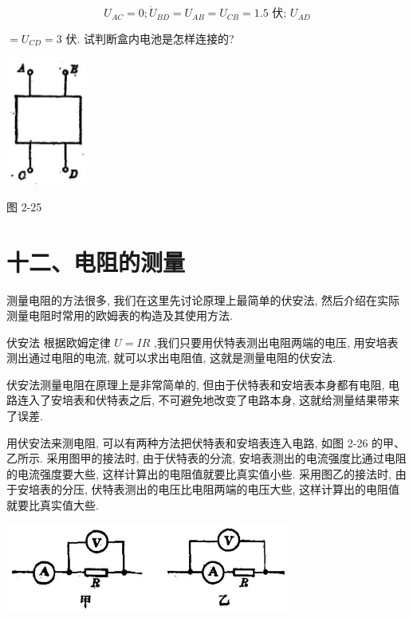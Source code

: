 \documentclass[10pt]{article}
\begin{document}
\[
{U}_{AC} = 0;{\dot{U}}_{BD} = {U}_{AB} = {U}_{CB} = {1.5}\text{ 伏; }{U}_{AD}
\]

\(= {U}_{CD} = 3\) 伏. 试判断盒内电池是怎样连接的?

\begin{center}
\includegraphics[max width=0.2\textwidth]{images/01913056-1f15-74d8-9184-9aab52c9d66b_95_683924.jpg}
\end{center}

图 2-25

\section*{十二、电阻的测量}

测量电阻的方法很多, 我们在这里先讨论原理上最简单的伏安法, 然后介绍在实际测量电阻时常用的欧姆表的构造及其使用方法.

伏安法 根据欧姆定律 \(U = {IR}\) ,我们只要用伏特表测出电阻两端的电压, 用安培表测出通过电阻的电流, 就可以求出电阻值, 这就是测量电阻的伏安法.

伏安法测量电阻在原理上是非常简单的, 但由于伏特表和安培表本身都有电阻, 电路连入了安培表和伏特表之后, 不可避免地改变了电路本身, 这就给测量结果带来了误差.

用伏安法来测电阻, 可以有两种方法把伏特表和安培表连入电路, 如图 2-26 的甲、乙所示. 采用图甲的接法时, 由于伏特表的分流, 安培表测出的电流强度比通过电阻的电流强度要大些, 这样计算出的电阻值就要比真实值小些. 采用图乙的接法时, 由于安培表的分压, 伏特表测出的电压比电阻两端的电压大些, 这样计算出的电阻值就要比真实值大些.

\begin{center}
\includegraphics[max width=0.7\textwidth]{images/01913056-1f15-74d8-9184-9aab52c9d66b_96_924093.jpg}
\end{center}
\end{document}
